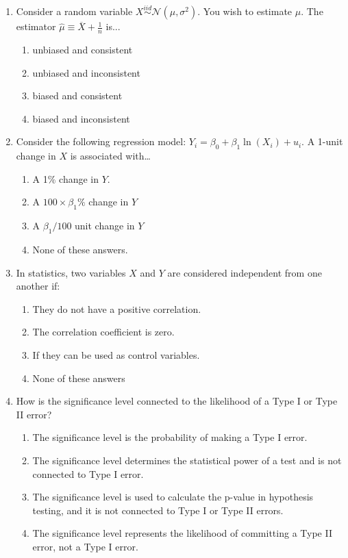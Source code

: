 \documentclass{article}
\begin{document}
\begin{enumerate}
\item Consider a random variable $X\stackrel{iid}{\sim}\mathcal{N}(\mu, \sigma^2)$. You wish to estimate $\mu$. The estimator $\hat{\mu}\equiv \overline{X} + \frac{1}{n} $ is...

\begin{enumerate}[label=\alph*)]
\item unbiased and consistent
\item unbiased and inconsistent
\item biased and consistent
\item biased and inconsistent
\end{enumerate}\vspace{.25cm}

\item Consider the following regression model: $Y_i = \beta_0 + \beta_1 \ln(X_i) + u_i$. A 1-unit change in $X$ is associated with…
\begin{enumerate}[label=\alph*)]
        \item A 1\% change in $Y$.
        \item A $100 \times \beta_1 \%$ change in $Y$
        \item A $\beta_1/100$ unit change in $Y$
        \item None of these answers.
\end{enumerate}\vspace{.25cm}

\item In statistics, two variables \(X\) and \(Y\) are considered independent from one another if:
    \begin{enumerate}[label=\alph*)]
        \item They do not have a positive correlation.
        \item The correlation coefficient is zero.
        \item If they can be used as control variables.
        \item None of these answers
    \end{enumerate}\vspace{.25cm}

    \newpage

\item How is the significance level connected to the likelihood of a Type I or Type II error?

\begin{enumerate}[label=\alph*)]
  \item The significance level is the probability of making a Type I error.
  \item The significance level determines the statistical power of a test and is not connected to Type I error.
  \item The significance level is used to calculate the p-value in hypothesis testing, and it is not connected to Type I or Type II errors.
  \item The significance level represents the likelihood of committing a Type II error, not a Type I error.
\end{enumerate}\vspace{.25cm}


\end{enumerate}
\end{document}
